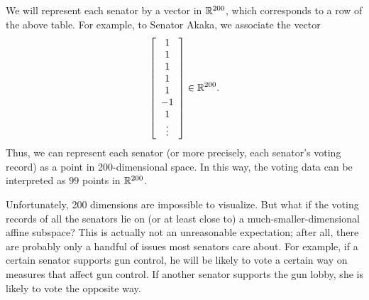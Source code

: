 \documentclass{ximera}
\begin{document}
We will represent each senator by a vector in $\R^{200}$, which
corresponds to a row of the above table. For example, to Senator
Akaka, we associate the vector
\begin{equation*}
  \startmat{c} 1 \\ 1 \\ 1 \\ 1 \\ 1 \\ -1 \\ 1 \\ \vdots \stopmat
  \in\R^{200}.
\end{equation*}
Thus, we can represent each senator (or more precisely, each senator's
voting record) as a point in 200-dimensional space. In this way, the
voting data can be interpreted as $99$ points in $\R^{200}$.

Unfortunately, 200 dimensions are impossible to visualize. But what if
the voting records of all the senators lie on (or at least close to) a
much-smaller-dimensional affine subspace? This is actually not an
unreasonable expectation; after all, there are probably only a handful
of issues most senators care about. For example, if a certain senator
supports gun control, he will be likely to vote a certain way on
measures that affect gun control. If another senator supports the gun
lobby, she is likely to vote the opposite way.
\end{document}
